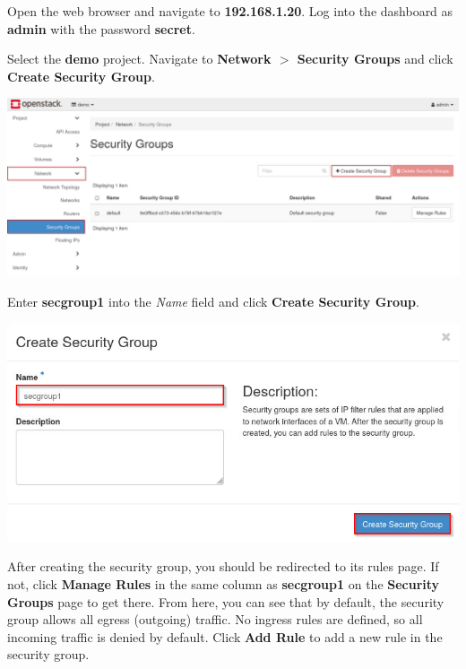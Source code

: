 \documentclass[letterpaper, 12pt]{article}
\begin{document}
\begin{enumerate}
    \begin{labstep}
        Open the web browser and navigate to \textbf{192.168.1.20}.
        Log into the dashboard as \textbf{admin} with the password \textbf{secret}.
    \end{labstep}

    \begin{labstep}
        Select the \textbf{demo} project.
        Navigate to \textbf{Network $>$ Security Groups} and click \textbf{Create Security Group}.

        \begin{center}
            \includegraphics[width=\linewidth]{images/part5/step2.png}
        \end{center}
    \end{labstep}

    \begin{labstep}
        Enter \textbf{secgroup1} into the \textit{Name} field and click \textbf{Create Security Group}.

        \begin{center}
            \includegraphics[width=\linewidth]{images/part5/step3.png}
        \end{center}
    \end{labstep}

    \begin{labstep}
        After creating the security group, you should be redirected to its rules page.
        If not, click \textbf{Manage Rules} in the same column as \textbf{secgroup1} on the \textbf{Security Groups} page to get there.
        From here, you can see that by default, the security group allows all egress (outgoing) traffic.
        No ingress rules are defined, so all incoming traffic is denied by default.
        Click \textbf{Add Rule} to add a new rule in the security group.


\end{labstep}
\end{enumerate}
\end{document}
